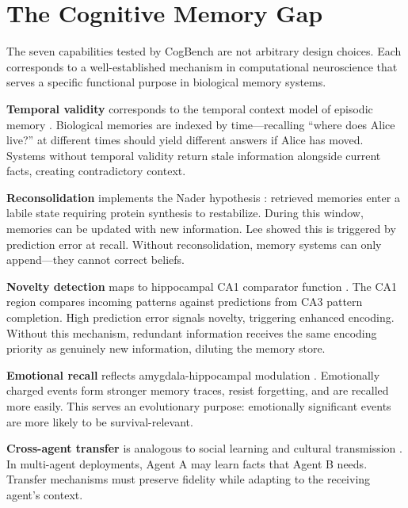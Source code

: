 \documentclass{article}
\begin{document}
\section{The Cognitive Memory Gap}
\label{sec:gap}

The seven capabilities tested by CogBench are not arbitrary design choices. Each corresponds to a well-established mechanism in computational neuroscience that serves a specific functional purpose in biological memory systems.

\textbf{Temporal validity} corresponds to the temporal context model of episodic memory \citep{howard2002temporal}. Biological memories are indexed by time---recalling ``where does Alice live?'' at different times should yield different answers if Alice has moved. Systems without temporal validity return stale information alongside current facts, creating contradictory context.

\textbf{Reconsolidation} implements the Nader hypothesis \citep{nader2000fear}: retrieved memories enter a labile state requiring protein synthesis to restabilize. During this window, memories can be updated with new information. Lee \citep{lee2009reconsolidation} showed this is triggered by prediction error at recall. Without reconsolidation, memory systems can only append---they cannot correct beliefs.

\textbf{Novelty detection} maps to hippocampal CA1 comparator function \citep{rolls2013mechanisms}. The CA1 region compares incoming patterns against predictions from CA3 pattern completion. High prediction error signals novelty, triggering enhanced encoding. Without this mechanism, redundant information receives the same encoding priority as genuinely new information, diluting the memory store.

\textbf{Emotional recall} reflects amygdala-hippocampal modulation \citep{mcgaugh2004amygdala, labar2006cognitive}. Emotionally charged events form stronger memory traces, resist forgetting, and are recalled more easily. This serves an evolutionary purpose: emotionally significant events are more likely to be survival-relevant.

\textbf{Cross-agent transfer} is analogous to social learning and cultural transmission \citep{tomasello1999cultural}. In multi-agent deployments, Agent A may learn facts that Agent B needs. Transfer mechanisms must preserve fidelity while adapting to the receiving agent's context.
\end{document}
